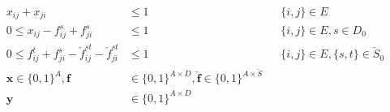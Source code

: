 \begin{small}
\begin{subequations}
\begin{flalign}
		    \label{con:mfinpf2:zbound} x_{ij}+x_{ji}&\leq 1 &&\{i,j\}\in E \\
  		    \label{con:mfinpf2:xbound} 0\leq x_{ij}-f_{ij}^s+f_{ji}^s & \leq 1 && \{i,j\}\in E,  s\in D_0 \\
\label{con:mfinpf2:fbound} 0\leq f_{ij}^t+f_{ji}^s-\check{f}_{ij}^{st}-\check{f}_{ji}^{st} & \leq 1 && \{i,j\}\in E,\{s,t\}\in \check{S}_0 \\
		    \label{con:mfinpf2:dim}	\mathbf{x} \in \{0,1\}^{A},\mathbf{f}&\in\{0,1\}^{A \times D},\mathbf{\check{f}}\in\{0,1\}^{A\times \check{S}} \\ 
		    \label{con:mfinpf2:dimy}\mathbf{y}&\in \{0,1\}^{A\times D}
    \end{flalign}
    \end{subequations}  
\end{small}

